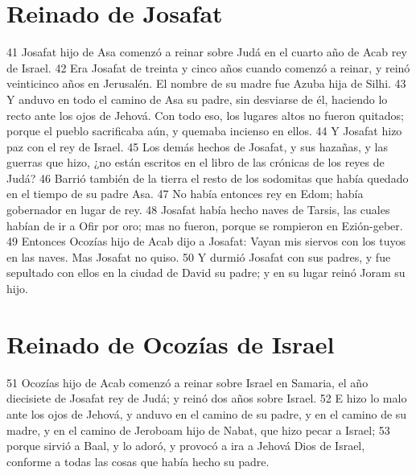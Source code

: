 \section*{Reinado de Josafat}

 
41 Josafat hijo de Asa comenzó a reinar sobre Judá en el cuarto año de Acab rey de Israel.
42 Era Josafat de treinta y cinco años cuando comenzó a reinar, y reinó veinticinco años en Jerusalén. El nombre de su madre fue Azuba hija de Silhi.
43 Y anduvo en todo el camino de Asa su padre, sin desviarse de él, haciendo lo recto ante los ojos de Jehová. Con todo eso, los lugares altos no fueron quitados; porque el pueblo sacrificaba aún, y quemaba incienso en ellos.
44 Y Josafat hizo paz con el rey de Israel.
45 Los demás hechos de Josafat, y sus hazañas, y las guerras que hizo, ¿no están escritos en el libro de las crónicas de los reyes de Judá?
46 Barrió también de la tierra el resto de los sodomitas que había quedado en el tiempo de su padre Asa.
47 No había entonces rey en Edom; había gobernador en lugar de rey.
48 Josafat había hecho naves de Tarsis, las cuales habían de ir a Ofir por oro; mas no fueron, porque se rompieron en Ezión-geber.
49 Entonces Ocozías hijo de Acab dijo a Josafat: Vayan mis siervos con los tuyos en las naves. Mas Josafat no quiso.
50 Y durmió Josafat con sus padres, y fue sepultado con ellos en la ciudad de David su padre; y en su lugar reinó Joram su hijo.
\section*{Reinado de Ocozías de Israel}

51 Ocozías hijo de Acab comenzó a reinar sobre Israel en Samaria, el año diecisiete de Josafat rey de Judá; y reinó dos años sobre Israel.
52 E hizo lo malo ante los ojos de Jehová, y anduvo en el camino de su padre, y en el camino de su madre, y en el camino de Jeroboam hijo de Nabat, que hizo pecar a Israel;
53 porque sirvió a Baal, y lo adoró, y provocó a ira a Jehová Dios de Israel, conforme a todas las cosas que había hecho su padre. 

